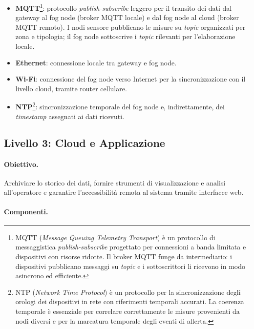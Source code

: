 \begin{itemize}
	\item \textbf{MQTT}\footnote{MQTT (\textit{Message Queuing Telemetry Transport}) è un protocollo di messaggistica \textit{publish-subscribe} progettato per connessioni a banda limitata e dispositivi con risorse ridotte. Il broker MQTT funge da intermediario: i dispositivi pubblicano messaggi su \textit{topic} e i sottoscrittori li ricevono in modo asincrono ed efficiente.}: protocollo \textit{publish-subscribe} leggero per il transito dei dati dal gateway al fog node (broker MQTT locale) e dal fog node al cloud (broker MQTT remoto). I nodi sensore pubblicano le misure su \textit{topic} organizzati per zona e tipologia; il fog node sottoscrive i \textit{topic} rilevanti per l'elaborazione locale.
	\item \textbf{Ethernet}: connessione locale tra gateway e fog node.
	\item \textbf{Wi-Fi}: connessione del fog node verso Internet per la sincronizzazione con il livello cloud, tramite router cellulare.
	\item \textbf{NTP}\footnote{NTP (\textit{Network Time Protocol}) è un protocollo per la sincronizzazione degli orologi dei dispositivi in rete con riferimenti temporali accurati. La coerenza temporale è essenziale per correlare correttamente le misure provenienti da nodi diversi e per la marcatura temporale degli eventi di allerta.}: sincronizzazione temporale del fog node e, indirettamente, dei \textit{timestamp} assegnati ai dati ricevuti.
\end{itemize}


\subsection{Livello 3: Cloud e Applicazione}

\paragraph{Obiettivo.} Archiviare lo storico dei dati, fornire strumenti di visualizzazione e analisi all'operatore e garantire l'accessibilità remota al sistema tramite interfacce web.

\paragraph{Componenti.}

